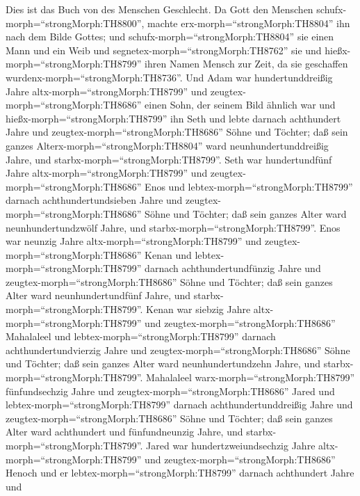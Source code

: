  Dies ist das Buch von des Menschen Geschlecht. Da Gott den
Menschen schufx-morph=``strongMorph:TH8800'', machte
erx-morph=``strongMorph:TH8804'' ihn nach dem Bilde Gottes; 
und schufx-morph=``strongMorph:TH8804'' sie einen Mann und ein Weib und
segnetex-morph=``strongMorph:TH8762'' sie und
hießx-morph=``strongMorph:TH8799'' ihren Namen Mensch zur Zeit, da sie
geschaffen wurdenx-morph=``strongMorph:TH8736''.  Und Adam
war hundertunddreißig Jahre altx-morph=``strongMorph:TH8799'' und
zeugtex-morph=``strongMorph:TH8686'' einen Sohn, der seinem Bild ähnlich
war und hießx-morph=``strongMorph:TH8799'' ihn Seth  und
lebte darnach achthundert Jahre und zeugtex-morph=``strongMorph:TH8686''
Söhne und Töchter;  daß sein ganzes
Alterx-morph=``strongMorph:TH8804'' ward neunhundertunddreißig Jahre,
und starbx-morph=``strongMorph:TH8799''.  Seth war
hundertundfünf Jahre altx-morph=``strongMorph:TH8799'' und
zeugtex-morph=``strongMorph:TH8686'' Enos  und
lebtex-morph=``strongMorph:TH8799'' darnach achthundertundsieben Jahre
und zeugtex-morph=``strongMorph:TH8686'' Söhne und Töchter; 
daß sein ganzes Alter ward neunhundertundzwölf Jahre, und
starbx-morph=``strongMorph:TH8799''.  Enos war neunzig Jahre
altx-morph=``strongMorph:TH8799'' und
zeugtex-morph=``strongMorph:TH8686'' Kenan  und
lebtex-morph=``strongMorph:TH8799'' darnach achthundertundfünzig Jahre
und zeugtex-morph=``strongMorph:TH8686'' Söhne und Töchter;
 daß sein ganzes Alter ward neunhundertundfünf Jahre, und
starbx-morph=``strongMorph:TH8799''.  Kenan war siebzig
Jahre altx-morph=``strongMorph:TH8799'' und
zeugtex-morph=``strongMorph:TH8686'' Mahalaleel  und
lebtex-morph=``strongMorph:TH8799'' darnach achthundertundvierzig Jahre
und zeugtex-morph=``strongMorph:TH8686'' Söhne und Töchter;
 daß sein ganzes Alter ward neunhundertundzehn Jahre, und
starbx-morph=``strongMorph:TH8799''.  Mahalaleel
warx-morph=``strongMorph:TH8799'' fünfundsechzig Jahre und
zeugtex-morph=``strongMorph:TH8686'' Jared  und
lebtex-morph=``strongMorph:TH8799'' darnach achthundertunddreißig Jahre
und zeugtex-morph=``strongMorph:TH8686'' Söhne und Töchter;
 daß sein ganzes Alter ward achthundert und fünfundneunzig
Jahre, und starbx-morph=``strongMorph:TH8799''.  Jared war
hundertzweiundsechzig Jahre altx-morph=``strongMorph:TH8799'' und
zeugtex-morph=``strongMorph:TH8686'' Henoch  und er
lebtex-morph=``strongMorph:TH8799'' darnach achthundert Jahre und
